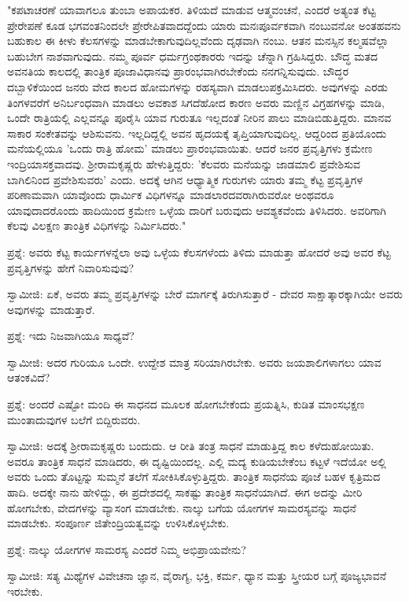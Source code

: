 "ಕಪಟಾಚರಣೆ ಯಾವಾಗಲೂ ತುಂಬಾ ಅಪಾಯಕರ. ತಿಳಿಯದೆ ಮಾಡುವ ಆತ್ಮವಂಚನೆ, ಎಂದರೆ ಅತ್ಯಂತ ಕೆಟ್ಟ ಪ್ರೇರೇಪಣೆ ಕೂಡ ಭಗವಂತನಿಂದಲೇ ಪ್ರೇರೇಪಿತವಾದದ್ದೆಂದು ಯಾರು ಮನಃಪೂರ್ವಕವಾಗಿ ನಂಬುವನೋ ಅಂತಹವನು ಬಹುಕಾಲ ಈ ಕೀಳು ಕೆಲಸಗಳನ್ನು ಮಾಡಬೇಕಾಗುವುದಿಲ್ಲವೆಂದು ದೃಢವಾಗಿ ನಂಬು. ಆತನ ಮನಸ್ಸಿನ ಕಲ್ಮಷವೆಲ್ಲಾ ಬಹುಬೇಗ ನಾಶವಾಗುವುದು. ನಮ್ಮ ಪೂರ್ವ ಧರ್ಮಗ್ರಂಥಕಾರರು ಇದನ್ನು ಚೆನ್ನಾಗಿ ಗ್ರಹಿಸಿದ್ದರು. ಬೌದ್ಧ ಮತದ ಅವನತಿಯ ಕಾಲದಲ್ಲಿ ತಾಂತ್ರಿಕ ಪೂಜಾವಿಧಾನವು ಪ್ರಾರಂಭವಾಗಿರಬೇಕೆಂದು ನನಗನ್ನಿಸುವುದು. ಬೌದ್ಧರ ದಬ್ಬಾಳಿಕೆಯಿಂದ ಜನರು ವೇದ ಕಾಲದ ಹೋಮಗಳನ್ನು ರಹಸ್ಯವಾಗಿ ಮಾಡಲುಪಕ್ರಮಿಸಿದರು. ಅವುಗಳನ್ನು ಎರಡು ತಿಂಗಳವರೆಗೆ ಅನಿರ್ಬಂಧವಾಗಿ ಮಾಡಲು ಅವಕಾಶ ಸಿಗದೆಹೋದ ಕಾರಣ ಅವರು ಮಣ್ಣಿನ ವಿಗ್ರಹಗಳನ್ನು ಮಾಡಿ, ಒಂದೇ ರಾತ್ರಿಯಲ್ಲಿ ಎಲ್ಲವನ್ನೂ ಪೂರೈಸಿ ಯಾವ ಗುರುತೂ ಇಲ್ಲದಂತೆ ನೀರಿನ ಪಾಲು ಮಾಡಿಬಿಡುತ್ತಿದ್ದರು. ಮಾನವ ಸಾಕಾರ ಸಂಕೇತವನ್ನು ಆಶಿಸುವನು. ಇಲ್ಲದಿದ್ದಲ್ಲಿ ಅವನ ಹೃದಯಕ್ಕೆ ತೃಪ್ತಿಯಾಗುವುದಿಲ್ಲ. ಆದ್ದರಿಂದ ಪ್ರತಿಯೊಂದು ಮನೆಯಲ್ಲಿಯೂ 'ಒಂದು ರಾತ್ರಿ ಹೋಮ' ಮಾಡಲು ಪ್ರಾರಂಭವಾಯಿತು. ಆದರೆ ಜನರ ಪ್ರವೃತ್ತಿಗಳು ಕ್ರಮೇಣ ಇಂದ್ರಿಯಾಸಕ್ತವಾದವು. ಶ‍್ರೀರಾಮಕೃಷ್ಣರು ಹೇಳುತ್ತಿದ್ದರು: 'ಕೆಲವರು ಮನೆಯನ್ನು ಜಾಡಮಾಲಿ ಪ್ರವೇಶಿಸುವ ಬಾಗಿಲಿನಿಂದ ಪ್ರವೇಶಿಸುವರು' ಎಂದು. ಅದಕ್ಕೆ ಆಗಿನ ಆಧ್ಯಾತ್ಮಿಕ ಗುರುಗಳು ಯಾರು ತಮ್ಮ ಕೆಟ್ಟ ಪ್ರವೃತ್ತಿಗಳ ಪರಿಣಾಮವಾಗಿ ಯಾವೊಂದು ಧಾರ್ಮಿಕ ವಿಧಿಗಳನ್ನೂ ಮಾಡಲಾರದವರಾಗಿರುವರೋ ಅಂಥವರೂ ಯಾವುದಾದರೊಂದು ಹಾದಿಯಿಂದ ಕ್ರಮೇಣ ಒಳ್ಳೆಯ ದಾರಿಗೆ ಬರುವುದು ಆವಶ್ಯಕವೆಂದು ತಿಳಿಸಿದರು. ಅವರಿಗಾಗಿ ಕೆಲವು ವಿಲಕ್ಷಣ ತಾಂತ್ರಿಕ ವಿಧಿಗಳನ್ನು ನಿರ್ಮಿಸಿದರು."

ಪ್ರಶ್ನೆ: ಅವರು ಕೆಟ್ಟ ಕಾರ್ಯಗಳನ್ನೆಲಾ ಅವು ಒಳ್ಳೆಯ ಕೆಲಸಗಳೆಂದು ತಿಳಿದು ಮಾಡುತ್ತಾ ಹೋದರೆ ಅವು ಅವರ ಕೆಟ್ಟ ಪ್ರವೃತ್ತಿಗಳನ್ನು ಹೇಗೆ ನಿವಾರಿಸುವುವು?

ಸ್ವಾಮೀಜಿ: ಏಕೆ, ಅವರು ತಮ್ಮ ಪ್ರವೃತ್ತಿಗಳನ್ನು ಬೇರೆ ಮಾರ್ಗಕ್ಕೆ ತಿರುಗಿಸುತ್ತಾರೆ - ದೇವರ ಸಾಕ್ಷಾತ್ಕಾರಕ್ಕಾಗಿಯೇ ಅವರು ಅವುಗಳನ್ನು ಮಾಡುತ್ತಾರೆ.

ಪ್ರಶ್ನೆ: ಇದು ನಿಜವಾಗಿಯೂ ಸಾಧ್ಯವೆ?

ಸ್ವಾಮೀಜಿ: ಅದರ ಗುರಿಯೂ ಒಂದೇ. ಉದ್ದೇಶ ಮಾತ್ರ ಸರಿಯಾಗಿರಬೇಕು. ಅವರು ಜಯಶಾಲಿಗಳಾಗಲು ಯಾವ ಆತಂಕವಿದೆ?

ಪ್ರಶ್ನೆ: ಅಂದರೆ ಎಷ್ಟೋ ಮಂದಿ ಈ ಸಾಧನದ ಮೂಲಕ ಹೋಗಬೇಕೆಂದು ಪ್ರಯತ್ನಿಸಿ, ಕುಡಿತ ಮಾಂಸಭಕ್ಷಣ ಮುಂತಾದುವುಗಳ ಬಲೆಗೆ ಬಿದ್ದಿರುವರು.

ಸ್ವಾಮೀಜಿ: ಅದಕ್ಕೆ ಶ‍್ರೀರಾಮಕೃಷ್ಣರು ಬಂದುದು. ಆ ರೀತಿ ತಂತ್ರ ಸಾಧನೆ ಮಾಡುತ್ತಿದ್ದ ಕಾಲ ಕಳೆದುಹೋಯಿತು. ಅವರೂ ತಾಂತ್ರಿಕ ಸಾಧನೆ ಮಾಡಿದರು, ಈ ದೃಷ್ಟಿಯಿಂದಲ್ಲ. ಎಲ್ಲಿ ಮದ್ಯ ಕುಡಿಯಬೇಕೆಂಬ ಕಟ್ಟಳೆ ಇದೆಯೋ ಅಲ್ಲಿ ಅವರು ಒಂದು ತೊಟ್ಟನ್ನು ಸುಮ್ಮನೆ ತಲೆಗೆ ಸೋಕಿಸಿಕೊಳ್ಳುತ್ತಿದ್ದರು. ತಾಂತ್ರಿಕ ಸಾಧನೆಯ ಪೂಜೆ ಬಹಳ ಕೃತ್ರಿಮದ ಹಾದಿ. ಅದಕ್ಕೇ ನಾನು ಹೇಳಿದ್ದು, ಈ ಪ್ರದೇಶದಲ್ಲಿ ಸಾಕಷ್ಟು ತಾಂತ್ರಿಕ ಸಾಧನೆಯಾಗಿದೆ. ಈಗ ಅದನ್ನು ಮೀರಿ ಹೋಗಬೇಕು, ವೇದಗಳನ್ನು ವ್ಯಾಸಂಗ ಮಾಡಬೇಕು. ನಾಲ್ಕು ಬಗೆಯ ಯೋಗಗಳ ಸಾಮರಸ್ಯವನ್ನು ಸಾಧನೆ ಮಾಡಬೇಕು. ಸಂಪೂರ್ಣ ಜಿತೇಂದ್ರಿಯತ್ವವನ್ನು ಉಳಿಸಿಕೊಳ್ಳಬೇಕು.

ಪ್ರಶ್ನೆ: ನಾಲ್ಕು ಯೋಗಗಳ ಸಾಮರಸ್ಯ ಎಂದರೆ ನಿಮ್ಮ ಅಭಿಪ್ರಾಯವೇನು?

ಸ್ವಾಮೀಜಿ: ಸತ್ಯ ಮಿಥ್ಯೆಗಳ ವಿವೇಚನಾ ಜ್ಞಾನ, ವೈರಾಗ್ಯ, ಭಕ್ತಿ, ಕರ್ಮ, ಧ್ಯಾನ ಮತ್ತು ಸ್ತ್ರೀಯರ ಬಗ್ಗೆ ಪೂಜ್ಯಭಾವನೆ ಇರಬೇಕು.

